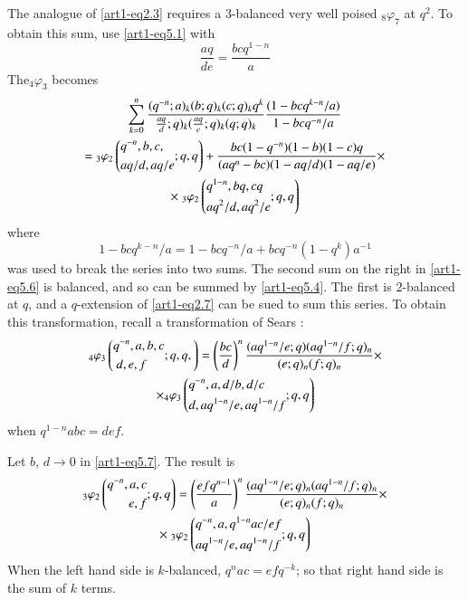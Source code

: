 The analogue of \eqref{art1-eq2.3} requires a 3-balanced very well poised ${}_8 \varphi_7$ at $q^2$. To obtain this sum, use \eqref{art1-eq5.1} with 
\begin{equation}
\frac{aq}{de} = \frac{bcq^{1-n}}{a} \label{art1-eq5.5}
\end{equation}
The\pageoriginale ${}_4 \varphi_3$ becomes
\begin{gather}
\sum\limits^n_{k=0} \frac{(q^{-n};a)_k(b;q)_k (c;q)_k q^k}{\frac{aq}{d}; q)_k (\frac{aq}{e};q)_k (q;q)_k } \frac{(1-bcq^{k-n}/a)}{1-bcq^{-n}/a}\label{art1-eq5.6}\\
= {}_3 \varphi_2 \left(
\begin{aligned}
& q^{-n}, b, c, \\
& aq/d, aq/e
\end{aligned} ; q, q
\right) + \frac{bc(1-q^{-n})(1-b)(1-c)q}{(aq^n - bc) (1-aq/d) (1-aq/e)} \times \notag\\
\times \; {}_3 \varphi_2 
\left(
\begin{aligned}
& q^{1-n}, bq, cq\\
& aq^2/d, aq^2/e
\end{aligned} ; q, q
\right) \notag
\end{gather}
where 
$$
1 - bcq^{k-n} / a = 1 - bcq^{-n}/ a + bcq^{-n} (1-q^k) a^{-1}
$$
was used to break the series into two sums. The second sum on the right in \eqref{art1-eq5.6} is balanced, and so can be summed by \eqref{art1-eq5.4}. The first is 2-balanced at $q$, and a $q$-extension of \eqref{art1-eq2.7} can be sued to sum this series. To obtain this transformation, recall a transformation of Sears \cite{art1-key12}:
\begin{gather}
{}_4 \varphi_3
\left(
\begin{aligned}
& q^{-n}, a, b,c \\
& ~ d,e,f
\end{aligned}; q, q,
\right) = 
\left(\frac{bc}{d} \right)^n
\frac{(aq^{1-n}/ e;q)(aq^{1-n}/f;q)_n}{(e;q)_n (f;q)_n} \times \\
\times {}_4 \varphi_3
\left(
\begin{aligned}
& q^{-n}, a, d/b, d/c\\
& d, aq^{1-n}/e, aq^{1-n}/f
\end{aligned};q,q
\right)
\notag
\end{gather}
when $q^{1-n}abc= def$.

Let $b$, $d \to 0$ in \eqref{art1-eq5.7}. The result is
\begin{gather}
{}_3 \varphi_2 
\left(
\begin{aligned}
q^{-n}, a, c\\
e,f
\end{aligned}; q,q
\right) = 
\left(\frac{efq^{n-1}}{a} \right)^n \frac{(aq^{1-n}/e;q)_n(aq^{1-n}/f;q)_n}{(e;q)_n (f;q)_n} \times \label{art1-eq5.8}\\
\times \; {}_3 \varphi_2 
\left(
\begin{aligned}
& q^{-n}, a, q^{1-n} ac/ ef\\
& aq^{1-n} / e, aq^{1-n}/f
\end{aligned} ; q,q
\right) \notag
\end{gather}
When the left hand side is $k$-balanced, $q^{n} ac = efq^{-k}$; so that right hand side is the sum of $k$ terms. 

